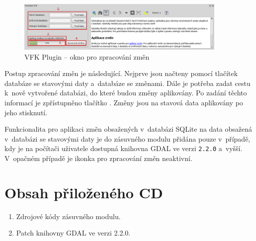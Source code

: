\documentclass[a4paper,12pt,oneside]{book}
\begin{document}
\begin{figure}[htb]
\centering
\includegraphics[width=0.9\textwidth]{images/vfkPlugin-prirucka_zmeny.png}
\caption[VFK Plugin -- okno pro zpracování změn]{VFK Plugin -- okno pro zpracování změn}
\label{l_plugin_zmeny}
\end{figure}

Postup zpracování změn je následující. Nejprve jsou načteny pomocí
tlačítek  databáze se stavovými daty a~databáze se
změnami. Dále je potřeba zadat cestu k~nově vytvořené databázi, do
které budou změny aplikovány. Po zadání těchto informací je
zpřístupněno tlačítko . Změny jsou na stavová data
aplikovány po jeho stisknutí.

Funkcionalita pro aplikaci změn obsažených v~databázi SQLite na data
obsažená v~databázi se stavovými daty je do zásuvného modulu přidána
pouze v~případě, kdy je na počítači uživatele dostupná knihovna GDAL
ve verzi \texttt{2.2.0} a~vyšší. V~opačném případě je ikonka pro
zpracování změn neaktivní.

\chapter{Obsah přiloženého CD}

\begin{enumerate}
 \item Zdrojové kódy zásuvného modulu.
 \item Patch knihovny GDAL ve verzi 2.2.0.
\end{enumerate}
\end{document}
